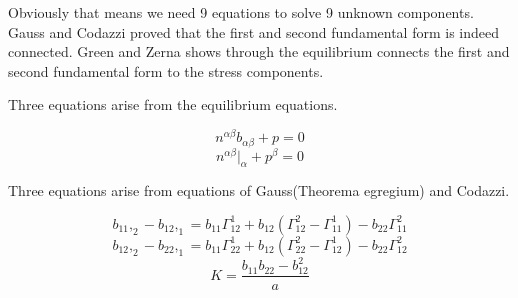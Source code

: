 \vspace{5mm}
Obviously that means we need 9 equations to solve 9 unknown components. Gauss and Codazzi proved that the first and second fundamental form is indeed connected. Green and Zerna shows through the equilibrium connects the first and second fundamental form to the stress components. 
\vspace{5mm}

Three equations arise from the equilibrium equations.

$$n^{\alpha \beta}b_{\alpha \beta} + p = 0$$
$$n^{\alpha \beta}|_\alpha + p^\beta = 0$$

Three equations arise from equations of Gauss(Theorema egregium) and Codazzi.


$$ b_{11},_2 - b_{12},_1 = b_{11} \Gamma^1_{12} + b_{12}(\Gamma^2_{12} - \Gamma^1_{11}) - b_{22}\Gamma^2_{11} $$
$$   b_{12},_2 - b_{22},_1 = b_{11} \Gamma^1_{22} + b_{12}(\Gamma^2_{22} - \Gamma^1_{12}) - b_{22}\Gamma^2_{12} $$
$$  K= \frac{b_{11}b_{22}-b^2_{12}}{a}$$

